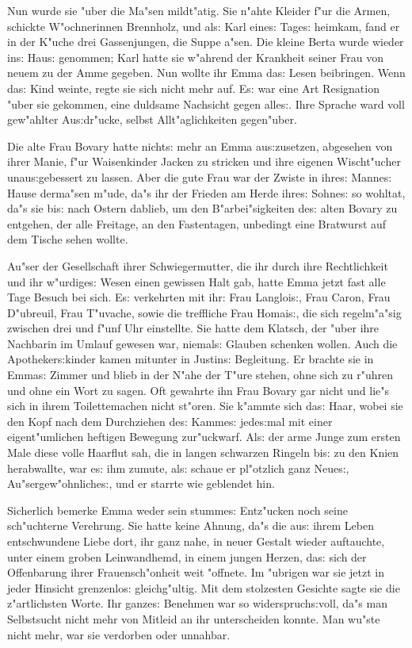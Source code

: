 \documentclass[oneside,12pt]{book}
\newcommand{\s}{s:}%
\begin{document}
Nun wurde sie "uber die Ma"sen mildt"atig. Sie n"ahte Kleider f"ur
die Armen, schickte W"ochnerinnen Brennholz, und al{\s} Karl
eine{\s} Tage{\s} heimkam, fand er in der K"uche drei
Gassenjungen, die Suppe a"sen. Die kleine Berta wurde wieder
in{\s} Hau{\s} genommen; Karl hatte sie w"ahrend der Krankheit
seiner Frau von neuem zu der Amme gegeben. Nun wollte ihr Emma
da{\s} Lesen beibringen. Wenn da{\s} Kind weinte, regte sie sich
nicht mehr auf. E{\s} war eine Art Resignation "uber sie gekommen,
eine duldsame Nachsicht gegen alle{\s}. Ihre Sprache ward voll
gew"ahlter Au{\s}dr"ucke, selbst Allt"aglichkeiten gegen"uber.

Die alte Frau Bovary hatte nicht{\s} mehr an Emma au{\s}zusetzen,
abgesehen von ihrer Manie, f"ur Waisenkinder Jacken zu stricken
und ihre eigenen Wischt"ucher unau{\s}gebessert zu lassen. Aber
die gute Frau war der Zwiste in ihre{\s} Manne{\s} Hause derma"sen
m"ude, da"s ihr der Frieden am Herde ihre{\s} Sohne{\s} so
wohltat, da"s sie bi{\s} nach Ostern dablieb, um den
B"arbei"sigkeiten de{\s} alten Bovary zu entgehen, der alle
Freitage, an den Fastentagen, unbedingt eine Bratwurst auf dem
Tische sehen wollte.

Au"ser der Gesellschaft ihrer Schwiegermutter, die ihr durch ihre
Rechtlichkeit und ihr w"urdige{\s} Wesen einen gewissen Halt gab,
hatte Emma jetzt fast alle Tage Besuch bei sich. E{\s} verkehrten
mit ihr: Frau Langloi{\s}, Frau Caron, Frau D"ubreuil, Frau
T"uvache, sowie die treffliche Frau Homai{\s}, die sich
regelm"a"sig zwischen drei und f"unf Uhr einstellte. Sie hatte dem
Klatsch, der "uber ihre Nachbarin im Umlauf gewesen war,
niemal{\s} Glauben schenken wollen. Auch die Apotheker{\s}kinder
kamen mitunter in Justin{\s} Begleitung. Er brachte sie in
Emma{\s} Zimmer und blieb in der N"ahe der T"ure stehen, ohne sich
zu r"uhren und ohne ein Wort zu sagen. Oft gewahrte ihn Frau
Bovary gar nicht und lie"s sich in ihrem Toilettemachen nicht
st"oren. Sie k"ammte sich da{\s} Haar, wobei sie den Kopf nach dem
Durchziehen de{\s} Kamme{\s} jede{\s}mal mit einer eigent"umlichen
heftigen Bewegung zur"uckwarf. Al{\s} der arme Junge zum ersten
Male diese volle Haarflut sah, die in langen schwarzen Ringeln
bi{\s} zu den Knien herabwallte, war e{\s} ihm zumute, al{\s}
schaue er pl"otzlich ganz Neue{\s}, Au"sergew"ohnliche{\s}, und er
starrte wie geblendet hin.

Sicherlich bemerke Emma weder sein stumme{\s} Ent\/z"ucken noch
seine sch"uchterne Verehrung. Sie hatte keine Ahnung, da"s die
au{\s} ihrem Leben entschwundene Liebe dort, ihr ganz nahe, in
neuer Gestalt wieder auftauchte, unter einem groben Leinwandhemd,
in einem jungen Herzen, da{\s} sich der Offenbarung ihrer
Frauensch"onheit weit "offnete. Im "ubrigen war sie jetzt in jeder
Hinsicht grenzenlo{\s} gleichg"ultig. Mit dem stolzesten Gesichte
sagte sie die z"artlichsten Worte. Ihr ganze{\s} Benehmen war so
widerspruch{\s}voll, da"s man Selbstsucht nicht mehr von Mitleid
an ihr unterscheiden konnte. Man wu"ste nicht mehr, war sie
verdorben oder unnahbar.
\end{document}
